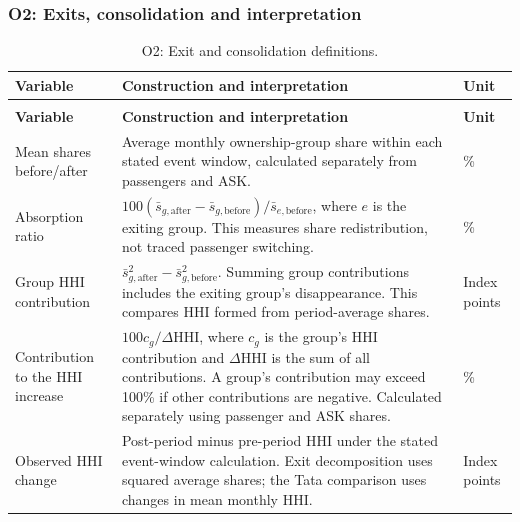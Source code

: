 \subsubsection{O2: Exits, consolidation and interpretation}
\label{app:o2-definitions}
\begingroup
\color{black}\small{}
\renewcommand{\arraystretch}{1.2}
\setlength{\tabcolsep}{5pt}
\captionsetup{font=small,labelfont=bf,justification=centering,singlelinecheck=false,skip=6pt}
\begin{longtable}{|>{\raggedright\arraybackslash}p{}|>{\raggedright\arraybackslash}p{}|>{\raggedright\arraybackslash}p{}|}
\caption{O2: Exit and consolidation definitions.}\label{tab:team-o2-variables}\\
\hline
\textbf{Variable} & \textbf{Construction and interpretation} & \textbf{Unit} \\
\hline
\endfirsthead
\multicolumn{3}{c}{\small Table~\thetable\ (continued)}\\[4pt]
\hline
\textbf{Variable} & \textbf{Construction and interpretation} & \textbf{Unit} \\
\hline
\endhead
Mean shares before/after & Average monthly ownership-group share within each stated event window, calculated separately from passengers and ASK. & \% \\
\hline
Absorption ratio & $100(\bar{s}_{g,\mathrm{after}}-\bar{s}_{g,\mathrm{before}})/\bar{s}_{e,\mathrm{before}}$, where $e$ is the exiting group. This measures share redistribution, not traced passenger switching. & \% \\
\hline
Group HHI contribution & $\bar{s}_{g,\mathrm{after}}^{2}-\bar{s}_{g,\mathrm{before}}^{2}$. Summing group contributions includes the exiting group's disappearance. This compares HHI formed from period-average shares. & Index points \\
\hline
Contribution to the HHI increase & $100c_g/\Delta\mathrm{HHI}$, where $c_g$ is the group's HHI contribution and $\Delta\mathrm{HHI}$ is the sum of all contributions. A group's contribution may exceed 100\% if other contributions are negative. Calculated separately using passenger and ASK shares. & \% \\
\hline
Observed HHI change & Post-period minus pre-period HHI under the stated event-window calculation. Exit decomposition uses squared average shares; the Tata comparison uses changes in mean monthly HHI. & Index points \\

\end{longtable}
